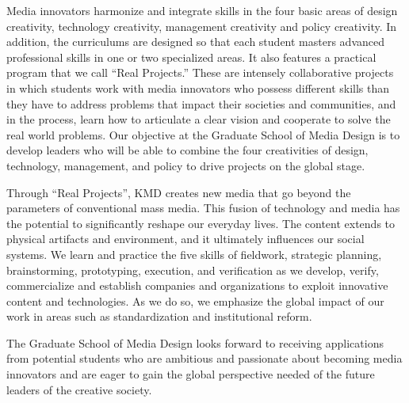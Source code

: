 Media innovators harmonize and integrate skills in the four basic areas
of design creativity, technology creativity,
management creativity and policy creativity.
In addition, the curriculums are designed so that each student masters
advanced professional skills in one or two specialized areas.
It also features a practical program that we call ``Real Projects.''
These are intensely collaborative projects in which students work
with media innovators who possess different skills than they have to
address problems that impact their societies and communities,
and in the process, learn how to articulate a clear vision
and cooperate to solve the real world problems.
Our objective at the Graduate School of Media Design is to develop
leaders who will be able to combine the four creativities of design,
technology, management, and policy to drive projects on the global stage.

Through ``Real Projects'', KMD creates new media that go beyond
the parameters of conventional mass media.
This fusion of technology and media has the potential
to significantly reshape our everyday lives.
The content extends to physical artifacts and environment,
and it ultimately influences our social systems.
We learn and practice the five skills of fieldwork, strategic planning,
brainstorming, prototyping, execution, and verification as we develop,
verify, commercialize and establish companies and organizations
to exploit innovative content and technologies.
As we do so, we emphasize the global impact of our work in areas
such as standardization and institutional reform.

The Graduate School of Media Design looks forward to receiving applications
from potential students who are ambitious and passionate
about becoming media innovators and are eager to gain
the global perspective needed of the future leaders of the creative society.

\putendnotes



